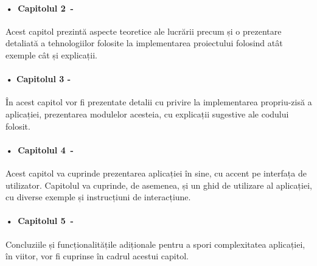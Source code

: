 \paragraph{•\, Capitolul 2\, -}Acest capitol prezintă aspecte teoretice ale lucrării precum și o prezentare detaliată a tehnologiilor folosite la implementarea proiectului folosind  atât exemple cât și explicații.

\paragraph{• Capitolul 3 -}În acest capitol vor fi prezentate detalii cu privire la implementarea propriu-zisă a aplicației, prezentarea modulelor acesteia, cu explicații sugestive ale codului folosit.

\paragraph{•\, Capitolul 4\, -}Acest capitol va cuprinde prezentarea aplicației în sine, cu accent pe interfața de utilizator. Capitolul va cuprinde, de asemenea, și un ghid de utilizare al aplicației, cu diverse exemple și instrucțiuni de interacțiune.

\paragraph{•\, Capitolul 5\, -}Concluziile și funcționalitățile adiționale pentru a spori complexitatea aplicației, în viitor, vor fi cuprinse în cadrul acestui capitol.

\label{chap:01}


